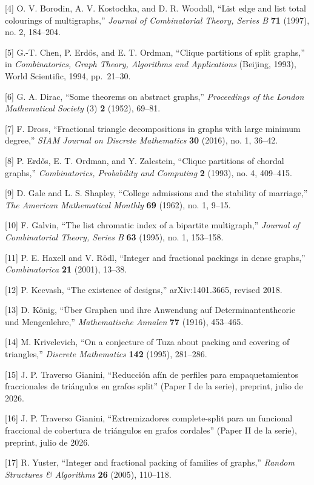 \documentclass[
  spanish,
  11pt,
  a4paper,
]{article}
\begin{document}
{[}4{]} O. V. Borodin, A. V. Kostochka, and D. R. Woodall, ``List edge and list total colourings of multigraphs,'' \emph{Journal of Combinatorial Theory, Series B} \textbf{71} (1997), no. 2, 184--204.

{[}5{]} G.-T. Chen, P. Erdős, and E. T. Ordman, ``Clique partitions of split graphs,'' in \emph{Combinatorics, Graph Theory, Algorithms and Applications} (Beijing, 1993), World Scientific, 1994, pp.~21--30.

{[}6{]} G. A. Dirac, ``Some theorems on abstract graphs,'' \emph{Proceedings of the London Mathematical Society} (3) \textbf{2} (1952), 69--81.

{[}7{]} F. Dross, ``Fractional triangle decompositions in graphs with large minimum degree,'' \emph{SIAM Journal on Discrete Mathematics} \textbf{30} (2016), no. 1, 36--42.

{[}8{]} P. Erdős, E. T. Ordman, and Y. Zalcstein, ``Clique partitions of chordal graphs,'' \emph{Combinatorics, Probability and Computing} \textbf{2} (1993), no. 4, 409--415.

{[}9{]} D. Gale and L. S. Shapley, ``College admissions and the stability of marriage,'' \emph{The American Mathematical Monthly} \textbf{69} (1962), no. 1, 9--15.

{[}10{]} F. Galvin, ``The list chromatic index of a bipartite multigraph,'' \emph{Journal of Combinatorial Theory, Series B} \textbf{63} (1995), no. 1, 153--158.

{[}11{]} P. E. Haxell and V. Rödl, ``Integer and fractional packings in dense graphs,'' \emph{Combinatorica} \textbf{21} (2001), 13--38.

{[}12{]} P. Keevash, ``The existence of designs,'' arXiv:1401.3665, revised 2018.

{[}13{]} D. König, ``Über Graphen und ihre Anwendung auf Determinantentheorie und Mengenlehre,'' \emph{Mathematische Annalen} \textbf{77} (1916), 453--465.

{[}14{]} M. Krivelevich, ``On a conjecture of Tuza about packing and covering of triangles,'' \emph{Discrete Mathematics} \textbf{142} (1995), 281--286.

{[}15{]} J. P. Traverso Gianini, ``Reducción afín de perfiles para empaquetamientos fraccionales de triángulos en grafos split'' (Paper I de la serie), preprint, julio de 2026.

{[}16{]} J. P. Traverso Gianini, ``Extremizadores complete-split para un funcional fraccional de cobertura de triángulos en grafos cordales'' (Paper II de la serie), preprint, julio de 2026.

{[}17{]} R. Yuster, ``Integer and fractional packing of families of graphs,'' \emph{Random Structures \& Algorithms} \textbf{26} (2005), 110--118.
\endgroup
\end{document}
